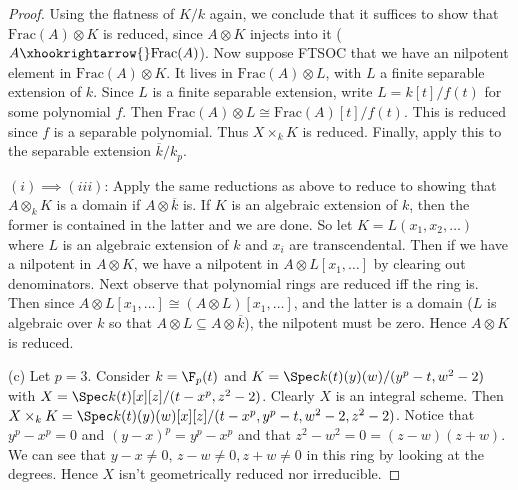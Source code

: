 \begin{proof}
	Using the flatness of $K / k $ again, we conclude that it suffices to show that $\text{Frac}(A) \otimes K $ is reduced, since $A \otimes K $ injects into it ($A \xhookrightarrow{} \text{Frac}(A) $).
	Now suppose FTSOC that we have an nilpotent element in $\text{Frac}(A) \otimes K $.
	It lives in $\text{Frac}(A) \otimes L $, with $L $ a finite separable extension of $k $.
	Since $L $ is a finite separable extension, write $L = k[t] / f(t) $ for some polynomial $f $.
	Then $\text{Frac}(A) \otimes L \cong \text{Frac}(A)[t] / f(t) $.
	This is reduced since $f $ is a separable polynomial.
	Thus $X \times _k K$ is reduced.
	Finally, apply this to the separable extension $\overline{k} / k_p  $.

	$(i) \implies (iii) $: Apply the same reductions as above to reduce to showing that $A \otimes_k K $ is a domain if $A \otimes \overline{k}  $ is.
	If $K $ is an algebraic extension of $k $, then the former is contained in the latter and we are done.
	So let $K = L(x_{1},x_{2}, \ldots )$ where $L $ is an algebraic extension of $k $ and $x_i $ are transcendental.
	Then if we have a nilpotent in $A \otimes K $, we have a nilpotent in $A \otimes L[x_{1}, \ldots ] $ by clearing out denominators.
	Next observe that polynomial rings are reduced iff the ring is.
	Then since $A \otimes L[x_{1}, \ldots ] \cong (A \otimes L)[x_{1}, \ldots ] $, and the latter is a domain ($L $ is algebraic over $k $ so that $A \otimes L \subseteq A \otimes \overline{k}  $), the nilpotent must be zero.
	Hence $A \otimes K $ is reduced.

	(c)
	Let $p=3 $.
	Consider $k = \F_p(t) $ and $K =\Spec k(t)(y)(w) / (y^p-t,w^2-2) $ with $X = \Spec k(t)[x][z] / (t-x^p,z^2-2) $.
	Clearly $X $ is an integral scheme.
	Then $X \times _k K = \Spec k(t)(y)(w)[x][z] / (t-x^p, y^p-t,w^2-2,z^2-2) $.
	Notice that $y^p-x^p = 0 $ and $(y-x)^p = y^p-x^p $ and that $z^2-w^2=0 = (z-w)(z+w) $.
	We can see that $y-x \ne 0 $, $z-w\ne 0,z+w\ne 0 $ in this ring by looking at the degrees.
	Hence $X $ isn't geometrically reduced nor irreducible.
\end{proof}

